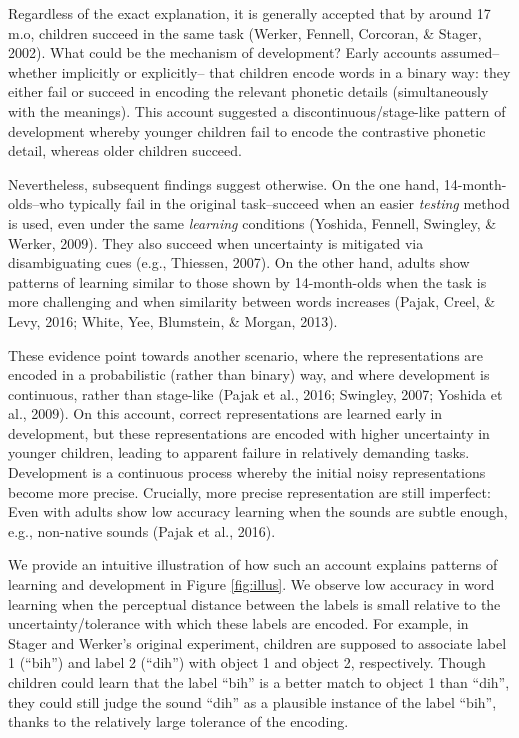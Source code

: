 \documentclass[10pt, letterpaper]{article}
\begin{document}
Regardless of the exact explanation, it is generally accepted that by
around 17 m.o, children succeed in the same task (Werker, Fennell,
Corcoran, \& Stager, 2002). What could be the mechanism of development?
Early accounts assumed--whether implicitly or explicitly-- that children
encode words in a binary way: they either fail or succeed in encoding
the relevant phonetic details (simultaneously with the meanings). This
account suggested a discontinuous/stage-like pattern of development
whereby younger children fail to encode the contrastive phonetic detail,
whereas older children succeed.

Nevertheless, subsequent findings suggest otherwise. On the one hand,
14-month-olds--who typically fail in the original task--succeed when an
easier \emph{testing} method is used, even under the same
\emph{learning} conditions (Yoshida, Fennell, Swingley, \& Werker,
2009). They also succeed when uncertainty is mitigated via
disambiguating cues (e.g., Thiessen, 2007). On the other hand, adults
show patterns of learning similar to those shown by 14-month-olds when
the task is more challenging and when similarity between words increases
(Pajak, Creel, \& Levy, 2016; White, Yee, Blumstein, \& Morgan, 2013).

These evidence point towards another scenario, where the representations
are encoded in a probabilistic (rather than binary) way, and where
development is continuous, rather than stage-like (Pajak et al., 2016;
Swingley, 2007; Yoshida et al., 2009). On this account, correct
representations are learned early in development, but these
representations are encoded with higher uncertainty in younger children,
leading to apparent failure in relatively demanding tasks. Development
is a continuous process whereby the initial noisy representations become
more precise. Crucially, more precise representation are still
imperfect: Even with adults show low accuracy learning when the sounds
are subtle enough, e.g., non-native sounds (Pajak et al., 2016).

We provide an intuitive illustration of how such an account explains
patterns of learning and development in Figure \ref{fig:illus}. We
observe low accuracy in word learning when the perceptual distance
between the labels is small relative to the uncertainty/tolerance with
which these labels are encoded. For example, in Stager and Werker's
original experiment, children are supposed to associate label 1
(``bih'') and label 2 (``dih'') with object 1 and object 2,
respectively. Though children could learn that the label ``bih'' is a
better match to object 1 than ``dih'', they could still judge the sound
``dih'' as a plausible instance of the label ``bih'', thanks to the
relatively large tolerance of the encoding.
\end{document}
